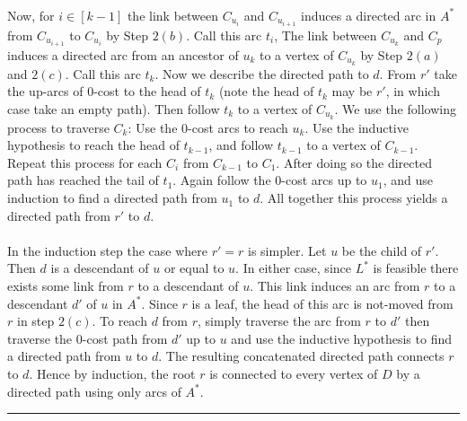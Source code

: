 \documentclass[letterpaper,12pt,oneside,onecolumn]{article}
\newenvironment{proof}{{\bf Proof:  }}{\hfill\rule{2mm}{2mm}}
\begin{document}
\begin{proof}
\paragraph{}
Now, for $i \in [k-1]$ the link between $C_{u_{i}}$ and $C_{u_{i+1}}$ induces a directed arc in $A^*$ from $C_{u_{i+1}}$ to $C_{u_i}$ by Step $2(b)$. Call this arc $t_i$, The link between $C_{u_k}$ and $C_p$ induces a directed arc from an ancestor of $u_k$ to a vertex of $C_{u_k}$ by Step $2(a)$ and $2(c)$. Call this arc $t_k$. Now we describe the directed path to $d$. From $r'$ take the up-arcs of $0$-cost to the head of $t_k$ (note the head of $t_k$ may be $r'$, in which case take an empty path). Then follow $t_k$ to a vertex of $C_{u_k}$. We use the following process to traverse $C_k$: Use the $0$-cost arcs to reach $u_k$. Use the inductive hypothesis to reach the head of $t_{k-1}$, and follow $t_{k-1}$ to a vertex of $C_{k-1}$. Repeat this process for each $C_i$ from $C_{k-1}$ to $C_1$. After doing so the directed path has reached the tail of $t_1$. Again follow the $0$-cost arcs up to $u_1$, and use induction to find a directed path from $u_1$ to $d$. All together this process yields a directed path from $r'$ to $d$.
\paragraph{}
In the induction step the case where $r' =r$ is simpler. Let $u$ be the child of $r'$. Then $d$ is a descendant of $u$ or equal to $u$. In either case, since $L^*$ is feasible there exists some link from $r$ to a descendant of $u$. This link induces an arc from $r$ to a descendant $d'$ of $u$ in $A^*$. Since $r$ is a leaf, the head of this arc is not-moved from $r$ in step $2(c)$. To reach $d$ from $r$, simply traverse the arc from $r$ to $d'$ then traverse the $0$-cost path from $d'$ up to $u$ and use the inductive hypothesis to find a directed path from $u$ to $d$. The resulting concatenated directed path connects $r$ to $d$. Hence by induction, the root $r$ is connected to every vertex of $D$ by a directed path using only arcs of $A^*$.

\end{proof}
\end{document}
